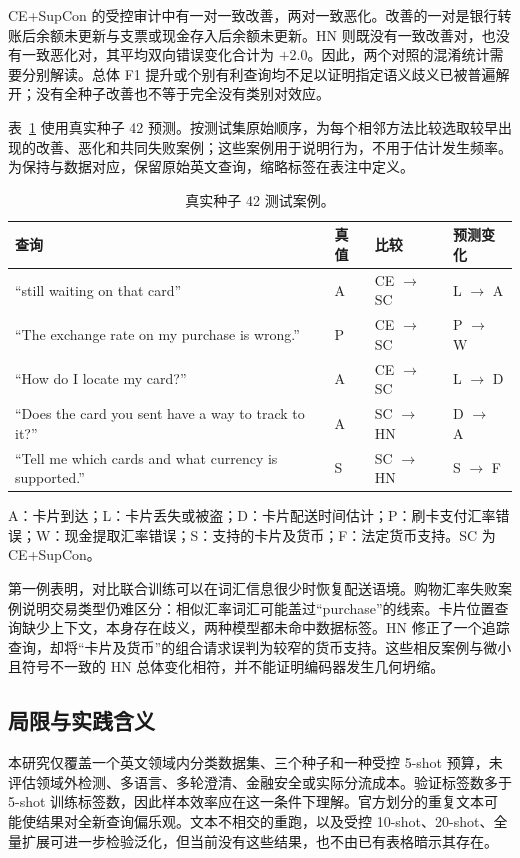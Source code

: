 \documentclass[runningheads]{llncs}
\begin{document}
CE+SupCon 的受控审计中有一对一致改善，两对一致恶化。改善的一对是银行转账后余额未更新与支票或现金存入后余额未更新。HN 则既没有一致改善对，也没有一致恶化对，其平均双向错误变化合计为 $+2.0$。因此，两个对照的混淆统计需要分别解读。总体 F1 提升或个别有利查询均不足以证明指定语义歧义已被普遍解开；没有全种子改善也不等于完全没有类别对效应。

表~\ref{tab:cases} 使用真实种子 42 预测。按测试集原始顺序，为每个相邻方法比较选取较早出现的改善、恶化和共同失败案例；这些案例用于说明行为，不用于估计发生频率。为保持与数据对应，保留原始英文查询，缩略标签在表注中定义。

\begin{table}[tb]\caption{真实种子 42 测试案例。}
\label{tab:cases}\centering\small
\begin{tabular}{@{}l@{\enspace}l@{\enspace}l@{\enspace}l@{}}\toprule
查询 & 真值 & 比较 & 预测变化\\\midrule
``still waiting on that card'' & A & CE $\to$ SC & L $\to$ A\\\addlinespace[3pt]
``The exchange rate on my purchase is wrong.'' & P & CE $\to$ SC & P $\to$ W\\\addlinespace[3pt]
``How do I locate my card?'' & A & CE $\to$ SC & L $\to$ D\\\addlinespace[3pt]
``Does the card you sent have a way to track to it?'' & A & SC $\to$ HN & D $\to$ A\\\addlinespace[3pt]
``Tell me which cards and what currency is supported.'' & S & SC $\to$ HN & S $\to$ F\\\bottomrule
\end{tabular}
\par\smallskip\noindent\parbox{\linewidth}{\small A：卡片到达；L：卡片丢失或被盗；D：卡片配送时间估计；P：刷卡支付汇率错误；W：现金提取汇率错误；S：支持的卡片及货币；F：法定货币支持。SC 为 CE+SupCon。}
\end{table}

第一例表明，对比联合训练可以在词汇信息很少时恢复配送语境。购物汇率失败案例说明交易类型仍难区分：相似汇率词汇可能盖过“purchase”的线索。卡片位置查询缺少上下文，本身存在歧义，两种模型都未命中数据标签。HN 修正了一个追踪查询，却将“卡片及货币”的组合请求误判为较窄的货币支持。这些相反案例与微小且符号不一致的 HN 总体变化相符，并不能证明编码器发生几何坍缩。

\subsection{局限与实践含义}
本研究仅覆盖一个英文领域内分类数据集、三个种子和一种受控 5-shot 预算，未评估领域外检测、多语言、多轮澄清、金融安全或实际分流成本。验证标签数多于 5-shot 训练标签数，因此样本效率应在这一条件下理解。官方划分的重复文本可能使结果对全新查询偏乐观。文本不相交的重跑，以及受控 10-shot、20-shot、全量扩展可进一步检验泛化，但当前没有这些结果，也不由已有表格暗示其存在。
\end{document}
